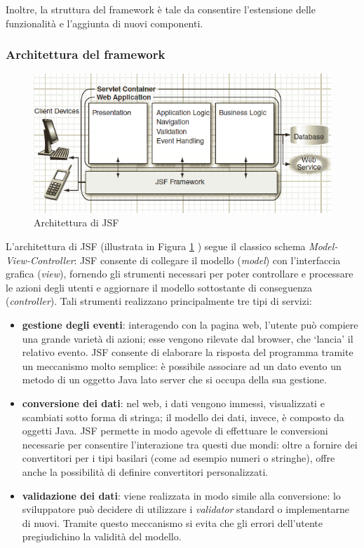 Inoltre, la struttura del framework è tale da consentire l'estensione delle funzionalità e l'aggiunta di nuovi componenti.\\

\subsubsection{Architettura del framework}

\begin{figure}
	\centering
	\includegraphics{JSF_architecture.png}
	\caption{Architettura di JSF}
	\label{jsf_arch}
\end{figure}

L'architettura di JSF (illustrata in Figura \ref{jsf_arch} ) segue il classico schema \textit{Model-View-Controller}: JSF consente di collegare il modello (\textit{model}) con l'interfaccia grafica (\textit{view}), fornendo gli strumenti necessari per poter controllare e processare le azioni degli utenti e aggiornare il modello sottostante di conseguenza (\textit{controller}). Tali strumenti realizzano principalmente tre tipi di servizi:

\begin{itemize}
\item \textbf{gestione degli eventi}: interagendo con la pagina web, l'utente può compiere una grande varietà di azioni; esse vengono rilevate dal browser, che \textquoteleft lancia\textquoteright{} il relativo evento. JSF consente di elaborare la risposta del programma tramite un meccanismo molto semplice: è possibile associare ad un dato evento un metodo di un oggetto Java lato server che si occupa della sua gestione.
\item \textbf{conversione dei dati}: nel web, i dati vengono immessi, visualizzati e scambiati sotto forma di stringa; il modello dei dati, invece, è composto da oggetti Java. JSF permette in modo agevole di effettuare le conversioni necessarie per consentire l'interazione tra questi due mondi: oltre a fornire dei convertitori per i tipi basilari (come ad esempio numeri o stringhe), offre anche la possibilità di definire convertitori personalizzati.
\item \textbf{validazione dei dati}: viene realizzata in modo simile alla conversione: lo sviluppatore può decidere di utilizzare i \textit{validator} standard o implementarne di nuovi. Tramite questo meccanismo si evita che gli errori dell'utente pregiudichino la validità del modello.
\end{itemize}


